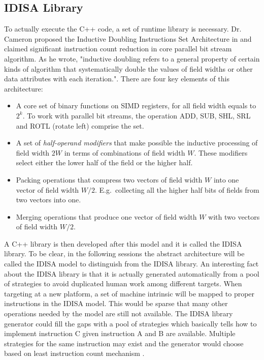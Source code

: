 \subsection{IDISA Library}
To actually execute the C++ code, a set of runtime library is necessary. Dr. Cameron proposed the Inductive Doubling Instructions Set Architecture in \cite{inductive_doubling_principle} and claimed significant instruction count reduction in core parallel bit stream algorithm. As he wrote, "inductive doubling refers to a general property of certain kinds of algorithm that systematically double the values of field widths or other data attributes with each iteration."\cite{inductive_doubling_principle}. There are four key elements of this architecture:
\begin{itemize}
    \item A core set of binary functions on SIMD registers, for all field width equals to $2^k$. To work with parallel bit streams, the operation ADD, SUB, SHL, SRL and ROTL (rotate left) comprise the set.
    \item A set of \textit{half-operand modifiers} that make possible the inductive processing of field width $2W$ in terms of combinations of field width $W$. These modifiers select either the lower half of the field or the higher half.
    \item Packing operations that compress two vectors of field width $W$ into one vector of field width $W/2$. E.g.\ collecting all the higher half bits of fields from two vectors into one.
    \item Merging operations that produce one vector of field width $W$ with two vectors of field width $W/2$.
\end{itemize}

A C++ library is then developed after this model and it is called the IDISA library. To be clear, in the following sessions the abstract architecture will be called the IDISA model to distinguish from the IDISA library. An interesting fact about the IDISA library is that it is actually generated automatically from a pool of strategies to avoid duplicated human work among different targets. When targeting at a new platform, a set of machine intrinsic will be mapped to proper instructions in the IDISA model. This would be sparse that many other operations needed by the model are still not available. The IDISA library generator could fill the gaps with a pool of strategies which basically tells how to implement instruction C given instruction A and B are available. Multiple strategies for the same instruction may exist and the generator would choose based on least instruction count mechanism \cite{hua_idisa}.

